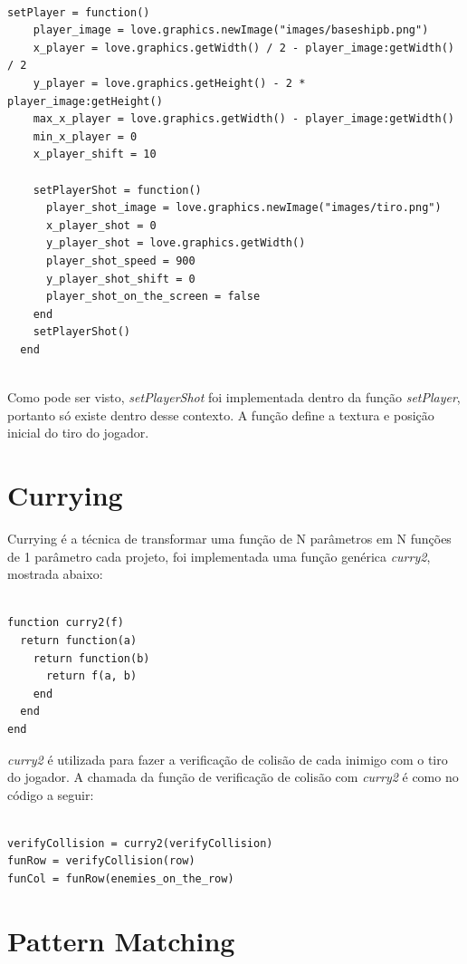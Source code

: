 \documentclass[rel_mlp]{iiufrgs}
\begin{document}
\begin{verbatim}

setPlayer = function()
    player_image = love.graphics.newImage("images/baseshipb.png")
    x_player = love.graphics.getWidth() / 2 - player_image:getWidth() / 2
    y_player = love.graphics.getHeight() - 2 * player_image:getHeight()
    max_x_player = love.graphics.getWidth() - player_image:getWidth()
    min_x_player = 0
    x_player_shift = 10

    setPlayerShot = function()
      player_shot_image = love.graphics.newImage("images/tiro.png")
      x_player_shot = 0
      y_player_shot = love.graphics.getWidth()
      player_shot_speed = 900
      y_player_shot_shift = 0
      player_shot_on_the_screen = false
    end
    setPlayerShot()
  end
    
\end{verbatim}

Como pode ser visto, \textit{setPlayerShot} foi implementada dentro da função \textit{setPlayer}, portanto só existe dentro desse contexto. A função define a textura e posição inicial do tiro do jogador.

\section{Currying} \label{Currying}

Currying é a técnica de transformar uma função de N parâmetros em N funções de 1 parâmetro cada \cite{CurryingLua} projeto, foi implementada uma função genérica \textit{curry2}, mostrada abaixo:

\begin{verbatim}

function curry2(f)
  return function(a)
    return function(b)
      return f(a, b)
    end
  end
end

\end{verbatim}

\textit{curry2} é utilizada para fazer a verificação de colisão de cada inimigo com o tiro do jogador. A chamada da função de verificação de colisão com \textit{curry2} é como no código a seguir:

\begin{verbatim}

verifyCollision = curry2(verifyCollision)
funRow = verifyCollision(row)
funCol = funRow(enemies_on_the_row)

\end{verbatim}

\section{Pattern Matching}
\end{document}
